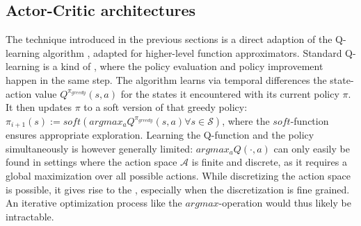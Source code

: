 \subsection{Actor-Critic architectures}

The technique introduced in the previous sections is a direct adaption of the Q-learning algorithm \cite{sutton_learning_1988}\cite{watkins_learning_1989}, adapted for higher-level function approximators. Standard Q-learning is a kind of , where the policy evaluation and policy improvement happen in the same step. The algorithm learns via temporal differences the state-action value $Q^{\pi_{greedy}}(s,a)$ for the states it encountered with its current policy $\pi$. It then updates $\pi$ to a soft version of that greedy policy: $\pi_{i+1}(s) := soft(argmax_a Q^{\pi_{greedy}}(s,a) \forall s \in \mathcal{S})$, where the $soft$-function ensures appropriate exploration. Learning the Q-function and the policy simultaneously is however generally limited: $argmax_aQ(\cdot, a)$ can only easily be found in settings where the action space $\mathcal{A}$ is finite and discrete, as it requires a global maximization over all possible actions. While discretizing the action space is possible, it gives rise to the , especially when the discretization is fine grained. An iterative optimization process like the $argmax$-operation would thus likely be intractable.\\



